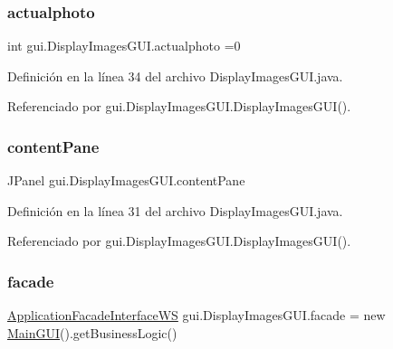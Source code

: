 \subsubsection{\texorpdfstring{actualphoto}{actualphoto}}
{\footnotesize\ttfamily int gui.\+Display\+Images\+G\+U\+I.\+actualphoto =0\hspace{0.3cm}{\ttfamily [private]}}



Definición en la línea 34 del archivo Display\+Images\+G\+U\+I.\+java.



Referenciado por gui.\+Display\+Images\+G\+U\+I.\+Display\+Images\+G\+U\+I().

\mbox{\label{classgui_1_1_display_images_g_u_i_af5565c2bb3ed37878d4812250658e895}} 
\subsubsection{\texorpdfstring{contentPane}{contentPane}}
{\footnotesize\ttfamily J\+Panel gui.\+Display\+Images\+G\+U\+I.\+content\+Pane\hspace{0.3cm}{\ttfamily [private]}}



Definición en la línea 31 del archivo Display\+Images\+G\+U\+I.\+java.



Referenciado por gui.\+Display\+Images\+G\+U\+I.\+Display\+Images\+G\+U\+I().

\mbox{\label{classgui_1_1_display_images_g_u_i_ae5514a460e8af8bc6293278b62791832}} 
\subsubsection{\texorpdfstring{facade}{facade}}
{\footnotesize\ttfamily \mbox{\hyperlink{interfacebusiness_logic_1_1_application_facade_interface_w_s}{Application\+Facade\+Interface\+WS}} gui.\+Display\+Images\+G\+U\+I.\+facade = new \mbox{\hyperlink{classgui_1_1_main_g_u_i}{Main\+G\+UI}}().get\+Business\+Logic()\hspace{0.3cm}{\ttfamily [private]}}



